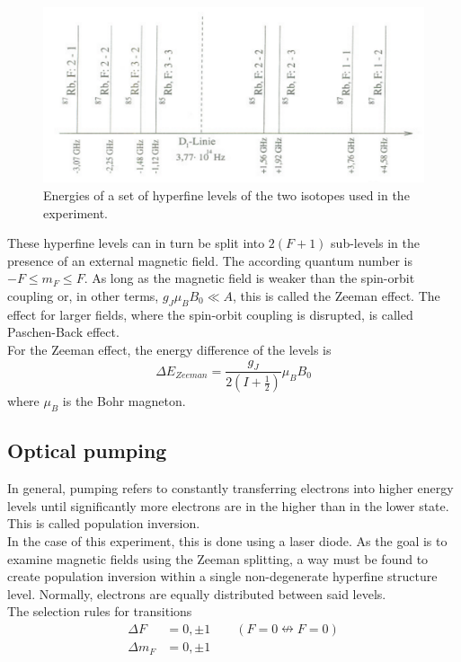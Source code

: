 \begin{figure}[H]
\centering
\includegraphics[width=1.0\linewidth]{graphics/hfslevels}
\caption[Hyperfine structure energies]{Energies of a set of hyperfine levels of the two isotopes used in the experiment. \cite{staatsex}}
\label{fig:hfslevels}
\end{figure}

These hyperfine levels can in turn be split into $2(F+1)$ sub-levels in the presence of an external magnetic field. The according quantum number is $-F\le m_F\le F$. As long as the magnetic field is weaker than the spin-orbit coupling or, in other terms, $g_J\mu_BB_0\ll A$, this is called the Zeeman effect. The effect for larger fields, where the spin-orbit coupling is disrupted, is called Paschen-Back effect.\\
For the Zeeman effect, the energy difference of the levels is
\begin{equation}
\Delta E_{Zeeman}=\frac{g_J}{2(I+\frac{1}{2})}\mu_BB_0
\label{eq:zeemanlevels}
\end{equation}
where $\mu_B$ is the Bohr magneton.

\subsection{Optical pumping}
In general, pumping refers to constantly transferring electrons into higher energy levels until significantly more electrons are in the higher than in the lower state. This is called population inversion.\\
In the case of this experiment, this is done using a laser diode. As the goal is to examine magnetic fields using the Zeeman splitting, a way must be found to create population inversion within a single non-degenerate hyperfine structure level. Normally, electrons are equally distributed between said levels.\\
The selection rules for transitions
\begin{equation}
\begin{aligned}
\Delta F&=0,\pm 1 \qquad (F=0\nleftrightarrow F=0)\\
\Delta m_F&=0,\pm 1
\end{aligned}
\end{equation}

